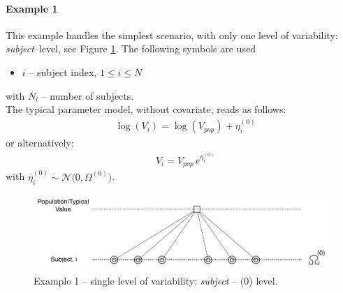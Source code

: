 \paragraph{Example 1}
This example handles the simplest scenario, with only one level of variability: \textit{subject}--level, see Figure \ref{tree_IOV0}. The following symbols are used
\begin{itemize}
\item
$i$ -- subject index, $1\le i \le N$
\end{itemize} 
with $N_l$ -- number of subjects.\\
The typical parameter model, without covariate, reads as follows:
\begin{align*}
& \log(V_i) = \log(V_{pop}) + \eta_i^{(0)}  
\end{align*} 
or alternatively:
\begin{align*}
& V_i = V_{pop} \,e^{\eta_i^{(0)}}  
\end{align*} 
with $\eta_i^{(0)} \sim \mathcal{N}\big(0,\Omega^{(0)}\big)$.


\begin{figure}[htb!]
\centering
  \includegraphics[width=120mm]{pics/tree_IOV0}
 \caption{Example 1 -- single level of variability: \textit{subject} -- (0) level.}
 \label{tree_IOV0}
\end{figure}

